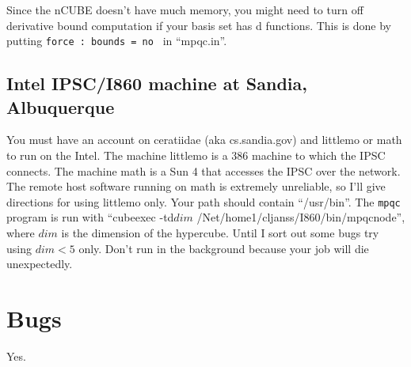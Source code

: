 Since the nCUBE doesn't have much memory, you might need to turn off
derivative bound computation if your basis set has d functions.  This
is done by putting {\tt force : bounds = no } in ``mpqc.in''.


\subsection{Intel IPSC/I860 machine at Sandia, Albuquerque}
You must have an account on ceratiidae (aka cs.sandia.gov) and
littlemo or math to run on the Intel.  The machine littlemo is
a 386 machine to which the IPSC connects.  The machine math is
a Sun 4 that accesses the IPSC over the network.  The remote host
software running on math is extremely unreliable, so I'll give
directions for using littlemo only.
Your path should contain ``/usr/bin''.
The {\tt mpqc} program is run
with ``cubeexec -td$dim$ /Net/home1/cljanss/I860/bin/mpqcnode'', where
$dim$ is the dimension of the hypercube.
Until I sort out some bugs
try using $dim < 5$ only.
Don't run in the background
because your job will die unexpectedly.

\section{Bugs}
Yes.



